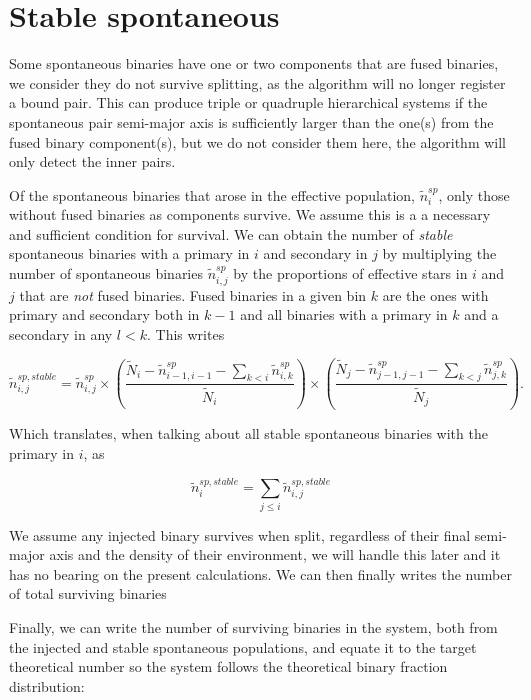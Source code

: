 \section{Stable spontaneous}

Some spontaneous binaries have one or two components that are fused binaries, we consider they do not survive splitting, as the algorithm will no longer register a bound pair. This can produce triple or quadruple hierarchical  systems if the spontaneous pair semi-major axis is sufficiently larger than the one(s) from the fused binary component(s), but we do not consider them here, the algorithm will only detect the inner pairs.

Of the spontaneous binaries that arose in the effective population,  $\tilde{n}_i^{sp}$, only those without fused binaries as components survive. We assume this is a a necessary and sufficient condition for survival. We can obtain the number of \textit{stable} spontaneous binaries with a primary in $i$ and secondary in $j$ by multiplying the number of spontaneous binaries $\tilde{n}_{i,j}^{sp}$ by the proportions of effective stars in $i$ and $j$ that are \textit{not} fused binaries. Fused binaries in a given bin $k$ are the ones with primary and secondary both in $k-1$ and all binaries with a primary in $k$ and a secondary in any $l<k$. This writes

\begin{equation}
\tilde{n}_{i,j}^{sp,stable} = \tilde{n}_{i,j}^{sp}  	 \times
\left( \frac{	\tilde{N}_i -
				\tilde{n}_{i-1,i-1}^{sp} - 
				\sum\limits_{k<i} \tilde{n}_{i,k}^{sp} }{\tilde{N}_i } \right) \times
\left( \frac{ 	\tilde{N}_j -
				\tilde{n}_{j-1,j-1}^{sp} - 
				\sum\limits_{k<j} \tilde{n}_{j,k}^{sp} }{\tilde{N}_j } \right).
\end{equation}

Which translates, when talking about all stable spontaneous binaries with the primary in $i$, as

\begin{equation}
\tilde{n}_{i}^{sp,stable} = \sum\limits_{j\le i} \tilde{n}_{i,j}^{sp,stable}  
\end{equation}


We assume any injected binary survives when split, regardless of their final semi-major axis and the density of their environment, we will handle this later and it has no bearing on the present calculations. We can then finally writes the number of total surviving binaries

Finally, we can write the number of surviving binaries in the system, both from the injected and stable spontaneous populations, and equate it to the target theoretical number so the system follows the theoretical binary fraction distribution:

